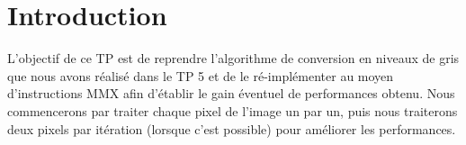 \chapter{Introduction}

L'objectif de ce TP est de reprendre l’algorithme de conversion en niveaux de gris que nous avons réalisé dans le TP 5 et de le ré-implémenter au moyen d’instructions MMX afin d’établir le gain éventuel de performances obtenu. Nous commencerons par traiter chaque pixel de l'image un par un, puis nous traiterons deux pixels par itération (lorsque c'est possible) pour améliorer les performances.